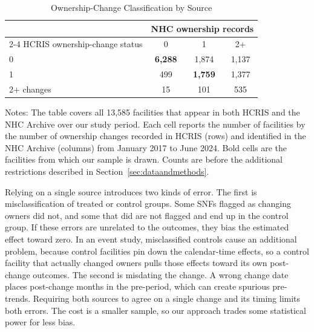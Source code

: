 \documentclass[12pt]{article}
\begin{document}
\begin{table}[!ht]
\centering
\caption{Ownership-Change Classification by Source}
\label{tab:ownership-classification-sample}

\begin{threeparttable}
\small
\begin{tabularx}{\textwidth}{lccc}
\toprule
& \multicolumn{3}{c}{NHC ownership records} \\
\cmidrule(lr){2-4}
HCRIS ownership-change status 
& 0 
& 1 
& 2+ \\
\midrule
0          & \textbf{6,288} & 1,874 & 1,137 \\
1          & 499 & \textbf{1,759} & 1,377 \\
2+ changes & 15 & 101 & 535 \\
\bottomrule
\end{tabularx}

\begin{tablenotes}
\footnotesize
\item Notes: The table covers all 13,585 facilities that appear in both HCRIS and the NHC Archive over our study period. Each cell reports the number of facilities by the number of ownership changes recorded in HCRIS (rows) and identified in the NHC Archive (columns) from January 2017 to June 2024. Bold cells are the facilities from which our sample is drawn. Counts are before the additional restrictions described in Section~\ref{sec:dataandmethods}.
\end{tablenotes}

\end{threeparttable}
\end{table}

\FloatBarrier

Relying on a single source introduces two kinds of error. The first is misclassification of treated or control groups. Some SNFs flagged as changing owners did not, and some that did are not flagged and end up in the control group. If these errors are unrelated to the outcomes, they bias the estimated effect toward zero. In an event study, misclassified controls cause an additional problem, because control facilities pin down the calendar-time effects, so a control facility that actually changed owners pulls those effects toward its own post-change outcomes. The second is misdating the change. A wrong change date places post-change months in the pre-period, which can create spurious pre-trends. Requiring both sources to agree on a single change and its timing limits both errors. The cost is a smaller sample, so our approach trades some statistical power for less bias.
\end{document}
